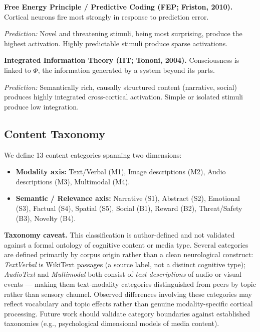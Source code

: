 \documentclass[11pt,letterpaper]{article}
\begin{document}
\begin{quotebox}
\textbf{Free Energy Principle / Predictive Coding (FEP; Friston, 2010).} Cortical neurons fire most strongly in response to prediction error.\par
\textit{Prediction:} Novel and threatening stimuli, being most surprising, produce the highest activation. Highly predictable stimuli produce sparse activations.
\end{quotebox}

\begin{quotebox}
\textbf{Integrated Information Theory (IIT; Tononi, 2004).} Consciousness is linked to $\Phi$, the information generated by a system beyond its parts.\par
\textit{Prediction:} Semantically rich, causally structured content (narrative, social) produces highly integrated cross-cortical activation. Simple or isolated stimuli produce low integration.
\end{quotebox}

\subsection{Content Taxonomy}

We define 13 content categories spanning two dimensions:

\begin{itemize}[leftmargin=1.4em,itemsep=2pt,topsep=2pt]
\item \textbf{Modality axis:} Text/Verbal (M1), Image descriptions (M2), Audio descriptions (M3), Multimodal (M4).
\item \textbf{Semantic / Relevance axis:} Narrative (S1), Abstract (S2), Emotional (S3), Factual (S4), Spatial (S5), Social (B1), Reward (B2), Threat/Safety (B3), Novelty (B4).
\end{itemize}

\noindent\textbf{Taxonomy caveat.} This classification is author-defined and not validated against a formal ontology of cognitive content or media type. Several categories are defined primarily by corpus origin rather than a clean neurological construct: \textit{TextVerbal} is WikiText passages (a source label, not a distinct cognitive type); \textit{AudioText} and \textit{Multimodal} both consist of \textit{text descriptions} of audio or visual events --- making them text-modality categories distinguished from peers by topic rather than sensory channel. Observed differences involving these categories may reflect vocabulary and topic effects rather than genuine modality-specific cortical processing. Future work should validate category boundaries against established taxonomies (e.g., psychological dimensional models of media content).
\end{document}
